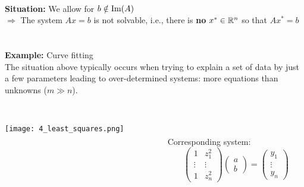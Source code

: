 \begin{frame}
	~\\
\textbf{Situation:} We allow for $b\notin \operatorname{Im}(A)$\\ $\Rightarrow$ The system $Ax=b$ is not solvable, i.e., there is \textbf{no} $x^* \in {\mathbb{R}}^{n}$ so that $Ax^* = b$\\~\\
%
~\\
\textbf{Example:} Curve fitting\\
The situation above typically occurs when trying to explain a set of data by just a few parameters leading to over-determined systems: more equations than unknowns ($m  \gg n$).\\~\\
\begin{columns}[t]
	\begin{column}[t]{0.45\textwidth}
		\texttt{[image: 4\_least\_squares.png]}
	\end{column}
	\begin{column}[t]{0.45\textwidth}
	 \vspace{-4.6cm}~\\
	Corresponding system:
	$$
\begin{pmatrix}
		1&z_1^2\\
		\vdots & \vdots \\
		1&z_n^2
\end{pmatrix}	
\begin{pmatrix} 
a\\ b
\end{pmatrix}
 =
\begin{pmatrix}
	y_1\\ \vdots \\ y_n
\end{pmatrix}
$$
	\end{column}
\end{columns}
~\\



\end{frame}


